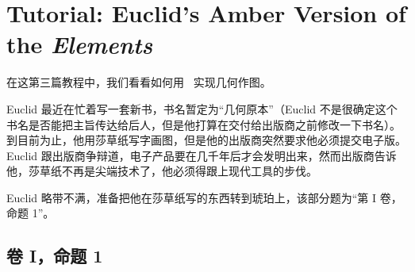 %
%
%


\section{Tutorial: Euclid's Amber Version of the \emph{Elements}}

\bohs

在这第三篇教程中，我们看看如何用 \tikzname\ 实现几何作图。

Euclid 最近在忙着写一套新书，书名暂定为“几何原本”（Euclid 不是很确定这个书名是否能把主旨传达给后人，但是他打算在交付给出版商之前修改一下书名）。
到目前为止，他用莎草纸写字画图，但是他的出版商突然要求他必须提交电子版。
Euclid 跟出版商争辩道，电子产品要在几千年后才会发明出来，然而出版商告诉他，莎草纸不再是尖端技术了，他必须得跟上现代工具的步伐。

Euclid 略带不满，准备把他在莎草纸写的东西转到琥珀上，该部分题为“第 I 卷，命题 1”。

\eohs

\subsection{卷 I，命题 1}


